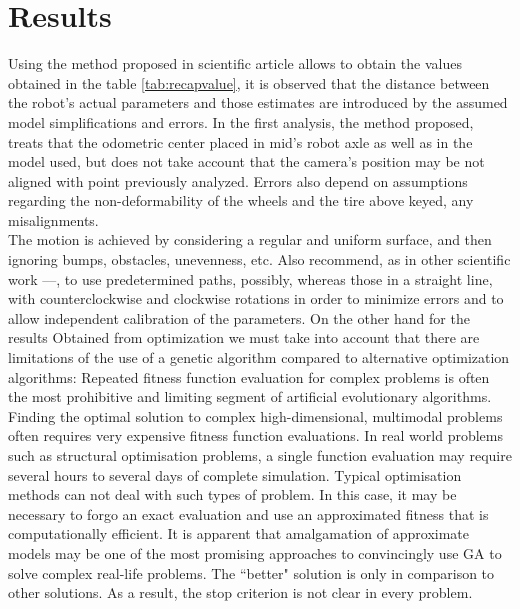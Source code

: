 \section{Results}
Using the method proposed in scientific article \cite{1512356} allows to obtain the values obtained in the table \ref{tab:recapvalue}, it is observed that the distance between the robot’s actual parameters and those estimates are introduced by the assumed model simplifications and errors.
In the first analysis, the method proposed, treats that the odometric center placed in mid’s robot axle as well as in the model used, but does not take account that the camera’s position may be not aligned with point previously analyzed.
Errors also depend on assumptions regarding the non-deformability of the wheels and the tire above keyed, any misalignments.\\ 
The motion is achieved by considering a regular and uniform surface, and then ignoring bumps, obstacles, unevenness, etc. 
Also recommend, as in other scientific work \cite{censi13joint}--\cite{Jung2016}--\cite{DBLP:journals/ijrr/ChongK99}, to use predetermined paths, possibly, whereas those in a straight line, with counterclockwise and clockwise rotations in order to minimize errors and to allow independent calibration of the parameters.
On the other hand for the results Obtained from optimization we must take into account that there are limitations of the use of a genetic algorithm compared to alternative optimization algorithms:
Repeated fitness function evaluation for complex problems is often the most prohibitive and limiting segment of artificial evolutionary algorithms. Finding the optimal solution to complex high-dimensional, multimodal problems often requires very expensive fitness function evaluations. In real world problems such as structural optimisation problems, a single function evaluation may require several hours to several days of complete simulation. Typical optimisation methods can not deal with such types of problem. In this case, it may be necessary to forgo an exact evaluation and use an approximated fitness that is computationally efficient. It is apparent that amalgamation of approximate models may be one of the most promising approaches to convincingly use GA to solve complex real-life problems.
The ``better" solution is only in comparison to other solutions. As a result, the stop criterion is not clear in every problem.
